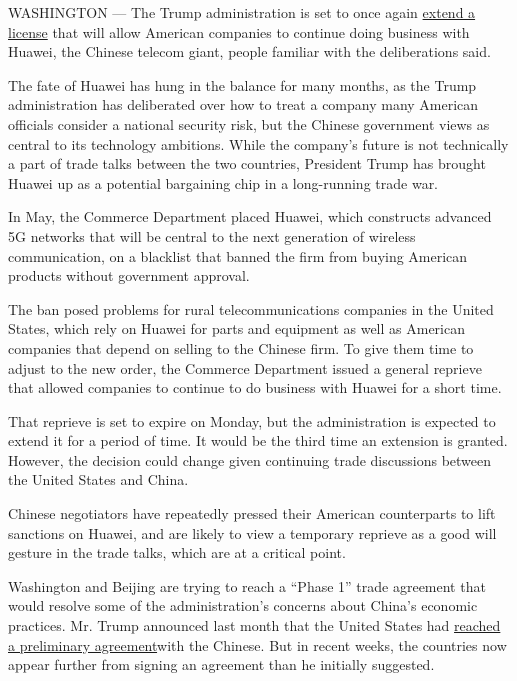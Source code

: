 WASHINGTON --- The Trump administration is set to once again
\href{https://www.nytimes.com/2019/08/19/us/politics/huawei-trump.html}{extend
a license} that will allow American companies to continue doing business
with Huawei, the Chinese telecom giant, people familiar with the
deliberations said.

The fate of Huawei has hung in the balance for many months, as the Trump
administration has deliberated over how to treat a company many American
officials consider a national security risk, but the Chinese government
views as central to its technology ambitions. While the company's future
is not technically a part of trade talks between the two countries,
President Trump has brought Huawei up as a potential bargaining chip in
a long-running trade war.

In May, the Commerce Department placed Huawei, which constructs advanced
5G networks that will be central to the next generation of wireless
communication, on a blacklist that banned the firm from buying American
products without government approval.

The ban posed problems for rural telecommunications companies in the
United States, which rely on Huawei for parts and equipment as well as
American companies that depend on selling to the Chinese firm. To give
them time to adjust to the new order, the Commerce Department issued a
general reprieve that allowed companies to continue to do business with
Huawei for a short time.

That reprieve is set to expire on Monday, but the administration is
expected to extend it for a period of time. It would be the third time
an extension is granted. However, the decision could change given
continuing trade discussions between the United States and China.

Chinese negotiators have repeatedly pressed their American counterparts
to lift sanctions on Huawei, and are likely to view a temporary reprieve
as a good will gesture in the trade talks, which are at a critical
point.

Washington and Beijing are trying to reach a ``Phase 1'' trade agreement
that would resolve some of the administration's concerns about China's
economic practices. Mr. Trump announced last month that the United
States had
\href{https://www.nytimes.com/2019/10/11/business/economy/us-china-trade-deal.html?module=inline}{reached
a preliminary agreement}with the Chinese. But in recent weeks, the
countries now appear further from signing an agreement than he initially
suggested.

